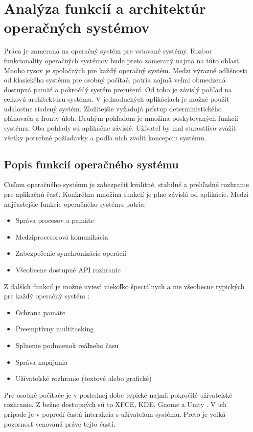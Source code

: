 \chapter{Analýza funkcií a architektúr operačných systémov}

Práca je zameraná na operačný systém pre vstavané systémy. Rozbor funkcionality operačných systémov bude preto zameraný najmä na túto oblasť. Mnoho rysov je spoločných pre každý operačný systém. Medzi výrazné odlišnosti od klasického systému pre osobný počítač, patria najmä veľmi obmedzená dostupná pamäť a pokročilý systém prerušení. Od toho je závislý pohľad na celkovú architektúru systému. V jednoduchých aplikáciach je možné použiť udalostne riadený systém. Zložitejšie vyžadujú prístup deterministického plánovača a fronty úloh. Druhým pohľadom je množina poskytovaných funkcií systému. Oba pohľady sú aplikačne závislé. Užívateľ by mal starostlivo zvážiť všetky potrebné požiadavky a podľa nich zvoliť koncepciu systému.

\section{Popis funkcií operačného systému}

Cieľom operačného systému je zabezpečiť kvalitné, stabilné a prehľadné rozhranie pre aplikačnú časť. Konkrétna množina funkcií je plne závislá od aplikácie. Medzi najčastejšie funkcie operačného systému patria:
\begin{itemize}
	\item Správa procesov a pamäte
	\item Medziprocesorová komunikácia
	\item Zabezpečenie synchronizácie operácií
	\item Všeobecne dostupné API rozhranie
\end{itemize}
Z ďalších funkcií je možné uviesť niekoľko špeciálnych a nie všeobecne typických pre každý operačný systém :
\begin{itemize}
	\item Ochrana pamäte
	\item Preemptívny multitasking
	\item Splnenie podmienok reálneho času
	\item Správa napájania
	\item Užívateľské rozhranie (textové alebo grafické)
\end{itemize}

Pre osobné počítače je v poslednej dobe typické najmä pokročilé užívateľské rozhranie. Z bežne dostupných sú to XFCE, KDE, Gnome a Unity
 \cite{linux_gui}. V ich prípade je v popredí častá interakcia s užívateľom systému. Preto je veľká pozornosť venovaná práve tejto časti.


